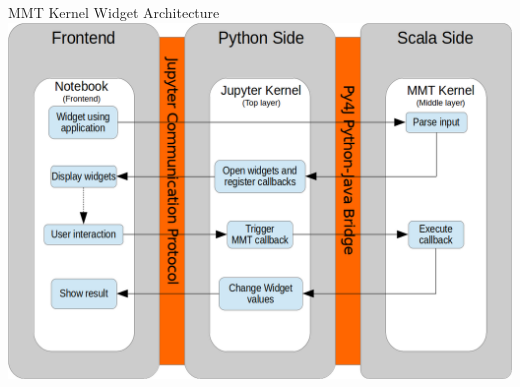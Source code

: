 \documentclass{beamer}
\begin{document}
    \begin{frame}{MMT Kernel Widget Architecture}
        \centering
        \includegraphics[scale=.35]{images/widgets}
    \end{frame}
\end{document}
